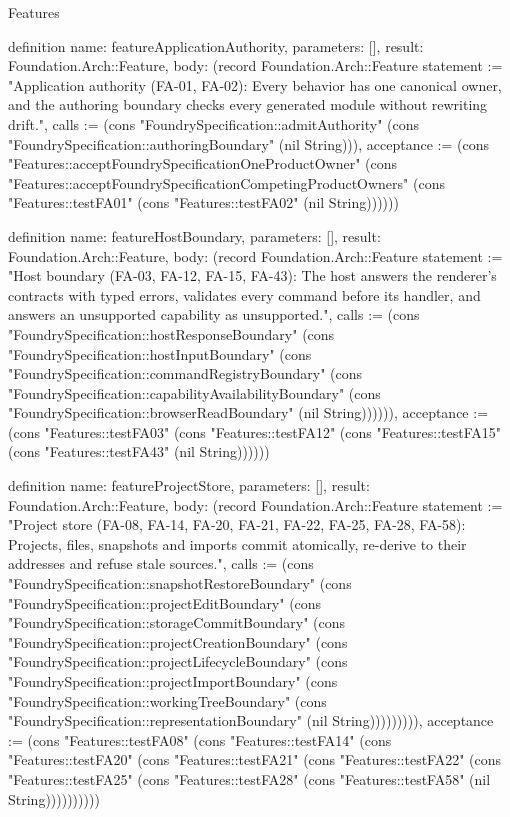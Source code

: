 \begin{lexlean}{Features}
\begin{semanticmodule}
definition{
  name: featureApplicationAuthority,
  parameters: [],
  result: Foundation.Arch::Feature,
  body: (record Foundation.Arch::Feature {statement := "Application authority (FA-01, FA-02): Every behavior has one canonical owner, and the authoring boundary checks every generated module without rewriting drift.", calls := (cons "FoundrySpecification::admitAuthority" (cons "FoundrySpecification::authoringBoundary" (nil String))), acceptance := (cons "Features::acceptFoundrySpecificationOneProductOwner" (cons "Features::acceptFoundrySpecificationCompetingProductOwners" (cons "Features::testFA01" (cons "Features::testFA02" (nil String)))))})
}

definition{
  name: featureHostBoundary,
  parameters: [],
  result: Foundation.Arch::Feature,
  body: (record Foundation.Arch::Feature {statement := "Host boundary (FA-03, FA-12, FA-15, FA-43): The host answers the renderer's contracts with typed errors, validates every command before its handler, and answers an unsupported capability as unsupported.", calls := (cons "FoundrySpecification::hostResponseBoundary" (cons "FoundrySpecification::hostInputBoundary" (cons "FoundrySpecification::commandRegistryBoundary" (cons "FoundrySpecification::capabilityAvailabilityBoundary" (cons "FoundrySpecification::browserReadBoundary" (nil String)))))), acceptance := (cons "Features::testFA03" (cons "Features::testFA12" (cons "Features::testFA15" (cons "Features::testFA43" (nil String)))))})
}

definition{
  name: featureProjectStore,
  parameters: [],
  result: Foundation.Arch::Feature,
  body: (record Foundation.Arch::Feature {statement := "Project store (FA-08, FA-14, FA-20, FA-21, FA-22, FA-25, FA-28, FA-58): Projects, files, snapshots and imports commit atomically, re-derive to their addresses and refuse stale sources.", calls := (cons "FoundrySpecification::snapshotRestoreBoundary" (cons "FoundrySpecification::projectEditBoundary" (cons "FoundrySpecification::storageCommitBoundary" (cons "FoundrySpecification::projectCreationBoundary" (cons "FoundrySpecification::projectLifecycleBoundary" (cons "FoundrySpecification::projectImportBoundary" (cons "FoundrySpecification::workingTreeBoundary" (cons "FoundrySpecification::representationBoundary" (nil String))))))))), acceptance := (cons "Features::testFA08" (cons "Features::testFA14" (cons "Features::testFA20" (cons "Features::testFA21" (cons "Features::testFA22" (cons "Features::testFA25" (cons "Features::testFA28" (cons "Features::testFA58" (nil String)))))))))})
}


\end{semanticmodule}
\end{lexlean}
